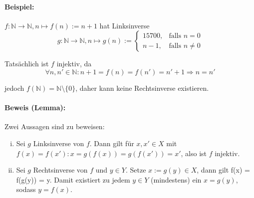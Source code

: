 \paragraph{Beispiel:}
	$ f:\mathbb{N}\to \mathbb{N}, n\mapsto f(n):= n+1 $ hat Linksinverse
	\begin{equation*}
		g:\mathbb{N} \to \mathbb{N}, n\mapsto g(n):=
		\begin{cases}
			15700, & \text{falls } n=0\\
			n-1, & \text{falls } n\neq 0
		\end{cases}
	\end{equation*}

	Tatsächlich ist $ f $ injektiv, da
	\begin{equation*}
		\forall n,n'\in \mathbb{N} : n+1 = f(n) = f(n') = n'+1 \Rightarrow n=n'
	\end{equation*}
	
	jedoch $ f(\mathbb{N}) = \mathbb{N}\setminus \{0\} $, daher kann keine Rechtsinverse existieren.

\paragraph{Beweis (Lemma):}
	Zwei Aussagen sind zu beweisen:
	\begin{enumerate}[i)]
		\item Sei $ g $ Linksinverse von $ f $. Dann gilt für $ x,x'\in X $ mit \\$ f(x) = f(x'): x = g(f(x)) = g(f(x')) = x' $, also ist $ f $ injektiv.
		\item Sei $g $ Rechtsinverse von $ f $ und $ y\in Y $. Setze $ x:= g(y)\in X $, dann gilt f(x) = f(g(y)) = y. Damit existiert zu jedem $ y\in Y $ (mindestens) ein $ x = g(y) $, sodass  $ y=f(x) $.
	\end{enumerate}
